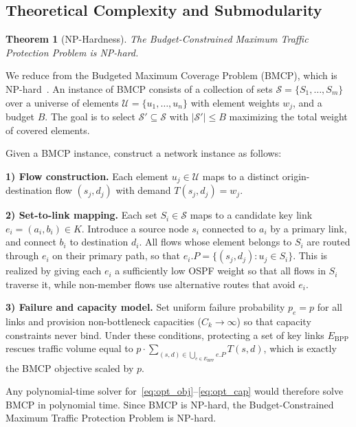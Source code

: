 \documentclass[journal]{IEEEtran}
\newtheorem{theorem}{Theorem}
\begin{document}
\subsection{Theoretical Complexity and Submodularity}

\begin{theorem}[NP-Hardness]
The Budget-Constrained Maximum Traffic Protection Problem is NP-hard.
\end{theorem}

\begin{IEEEproof}
We reduce from the Budgeted Maximum Coverage Problem (BMCP), which is NP-hard~\cite{feige1998threshold}. An instance of BMCP consists of a collection of sets $\mathcal{S} = \{S_1, \dots, S_m\}$ over a universe of elements $\mathcal{U} = \{u_1, \dots, u_n\}$ with element weights $w_j$, and a budget $B$. The goal is to select $\mathcal{S}' \subseteq \mathcal{S}$ with $|\mathcal{S}'| \le B$ maximizing the total weight of covered elements.

Given a BMCP instance, construct a network instance as follows:

\textbf{1) Flow construction.} Each element $u_j \in \mathcal{U}$ maps to a distinct origin-destination flow $(s_j, d_j)$ with demand $T(s_j, d_j) = w_j$.

\textbf{2) Set-to-link mapping.} Each set $S_i \in \mathcal{S}$ maps to a candidate key link $e_i = (a_i, b_i) \in K$. Introduce a source node $s_i$ connected to $a_i$ by a primary link, and connect $b_i$ to destination $d_i$. All flows whose element belongs to $S_i$ are routed through $e_i$ on their primary path, so that $e_i.P = \{(s_j, d_j) : u_j \in S_i\}$. This is realized by giving each $e_i$ a sufficiently low OSPF weight so that all flows in $S_i$ traverse it, while non-member flows use alternative routes that avoid $e_i$.

\textbf{3) Failure and capacity model.} Set uniform failure probability $p_e = p$ for all links and provision non-bottleneck capacities ($C_k \to \infty$) so that capacity constraints never bind. Under these conditions, protecting a set of key links $E_{\text{BPP}}$ rescues traffic volume equal to $p \cdot \sum_{(s,d) \in \bigcup_{e \in E_{\text{BPP}}} e.P} T(s, d)$, which is exactly the BMCP objective scaled by $p$.

Any polynomial-time solver for~\eqref{eq:opt_obj}--\eqref{eq:opt_cap} would therefore solve BMCP in polynomial time. Since BMCP is NP-hard, the Budget-Constrained Maximum Traffic Protection Problem is NP-hard.
\end{IEEEproof}
\end{document}
